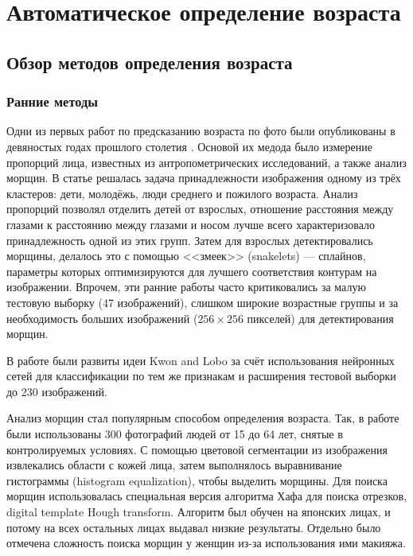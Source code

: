 \newpage
\section{Автоматическое определение возраста}

\subsection{Обзор методов определения возраста}

\subsubsection{Ранние методы}
Одни из первых работ по предсказанию возраста по фото были опубликованы в девяностых годах прошлого столетия \cite{kwon1}\cite{kwon2}. Основой их медода было измерение пропорций лица, известных из антропометрических исследований, а также анализ морщин. В статье решалась задача принадлежности изображения одному из трёх кластеров: дети, молодёжь, люди среднего и пожилого возраста. Анализ пропорций позволял отделить детей от взрослых, отношение расстояния между глазами к расстоянию между глазами и носом лучше всего характеризовало принадлежность одной из этих групп. Затем для взрослых детектировались морщины, делалось это с помощью <<змеек>> (snakelets) --- сплайнов, параметры которых оптимизируются для лучшего соответствия контурам на изображении. Впрочем, эти ранние работы часто критиковались за малую тестовую выборку (47 изображений), слишком широкие возрастные группы и за необходимость больших изображений ($ 256 \times 256 $ пикселей) для детектирования морщин.

В работе \cite{horng} были развиты идеи Kwon and Lobo за счёт использования нейронных сетей для классификации по тем же признакам и расширения тестовой выборки до 230 изображений.

Анализ морщин стал популярным способом определения возраста. Так, в работе \cite{hayashi} были использованы 300 фотографий людей от 15 до 64 лет, снятые в контролируемых условиях. С помощью цветовой сегментации из изображения извлекались области с кожей лица, затем выполнялось выравнивание гистограммы (histogram equalization), чтобы выделить морщины. Для поиска морщин использовалась специальная версия алгоритма Хафа для поиска отрезков, digital template Hough transform. Алгоритм был обучен на японских лицах, и потому на всех остальных лицах выдавал низкие результаты. Отдельно было отмечена сложность поиска морщин у женщин из-за использования ими макияжа.

